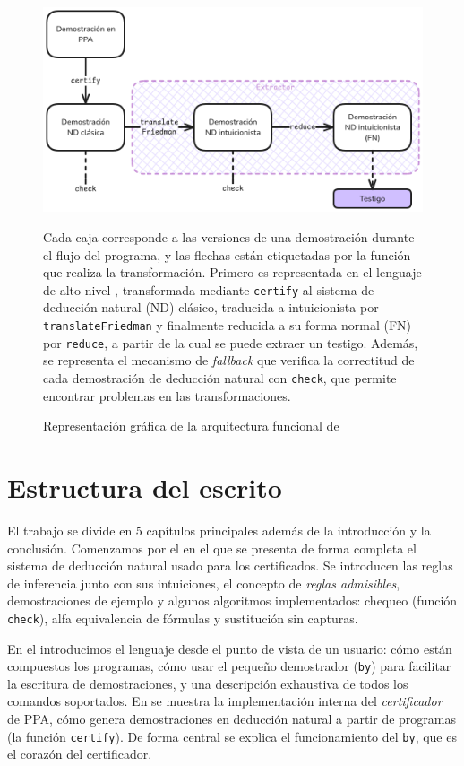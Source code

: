\begin{figure}[h]
    \includegraphics[scale=0.42]{img/arch.png}
    \centering
    \caption{Representación gráfica de la arquitectura funcional de \ppaTool{}}
    \medskip
    \small
    Cada caja corresponde a las versiones de una demostración durante el flujo del programa, y las flechas están etiquetadas por la función que realiza la transformación. Primero es representada en el lenguaje de alto nivel \ppaLang{}, transformada mediante \texttt{certify} al sistema de deducción natural (ND) clásico, traducida a intuicionista por \texttt{translateFriedman} y finalmente reducida a su forma normal (FN) por \texttt{reduce}, a partir de la cual se puede extraer un testigo.
    Además, se representa el mecanismo de \textit{fallback} que verifica la correctitud de cada demostración de deducción natural con \texttt{check}, que permite encontrar problemas en las transformaciones.
    \label{intro:fig:ppa-arch}
\end{figure}

\section{Estructura del escrito}

El trabajo se divide en 5 capítulos principales además de la introducción y la conclusión. Comenzamos por el  en el que se presenta de forma completa el sistema de deducción natural usado para los certificados. Se introducen las reglas de inferencia junto con sus intuiciones, el concepto de \textit{reglas admisibles}, demostraciones de ejemplo y algunos algoritmos implementados: chequeo (función \texttt{check}), alfa equivalencia de fórmulas y sustitución sin capturas.

En el  introducimos el lenguaje desde el punto de vista de un usuario: cómo están compuestos los programas, cómo usar el pequeño demostrador (\lstinline{by}) para facilitar la escritura de demostraciones, y una descripción exhaustiva de todos los comandos soportados. En  se muestra la implementación interna del \textit{certificador} de PPA, cómo genera demostraciones en deducción natural a partir de programas (la función \texttt{certify}). De forma central se explica el funcionamiento del \lstinline{by}, que es el corazón del certificador.


